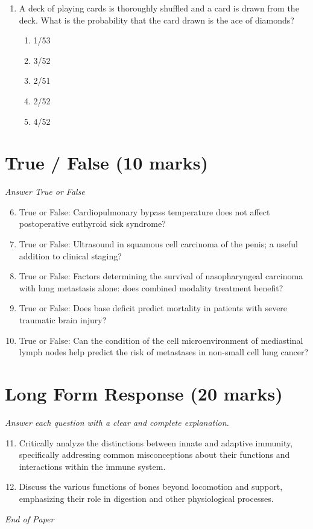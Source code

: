 \documentclass[12pt]{article}
\begin{document}
\begin{enumerate}[label=\arabic*.]
\begin{enumerate}[label=(\alph*)]
    \item Epidermal cell
    \item Stomatal guard cell
    \item Root cap cell
    \item Xylem vessel member
    \item Phloem sieve tube member
\end{enumerate}
\item A deck of playing cards is thoroughly shuffled and a card is drawn from the deck. What is the probability that the card drawn is the ace of diamonds?
\begin{enumerate}[label=(\alph*)]
    \item 1/53
    \item 3/52
    \item 2/51
    \item 2/52
    \item 4/52
\end{enumerate}
\end{enumerate}

\section*{True / False (10 marks)}
\textit{Answer True or False}
\begin{enumerate}[label=\arabic*.]
\setcounter{enumi}{5}
\item True or False: Cardiopulmonary bypass temperature does not affect postoperative euthyroid sick syndrome?
\item True or False: Ultrasound in squamous cell carcinoma of the penis; a useful addition to clinical staging?
\item True or False: Factors determining the survival of nasopharyngeal carcinoma with lung metastasis alone: does combined modality treatment benefit?
\item True or False: Does base deficit predict mortality in patients with severe traumatic brain injury?
\item True or False: Can the condition of the cell microenvironment of mediastinal lymph nodes help predict the risk of metastases in non-small cell lung cancer?
\end{enumerate}

\section*{Long Form Response (20 marks)}
\textit{Answer each question with a clear and complete explanation.}
\begin{enumerate}[label=\arabic*.]
\setcounter{enumi}{10}
\item Critically analyze the distinctions between innate and adaptive immunity, specifically addressing common misconceptions about their functions and interactions within the immune system.
\item Discuss the various functions of bones beyond locomotion and support, emphasizing their role in digestion and other physiological processes.
\end{enumerate}

\vfill
\noindent\textit{End of Paper}
\end{document}
